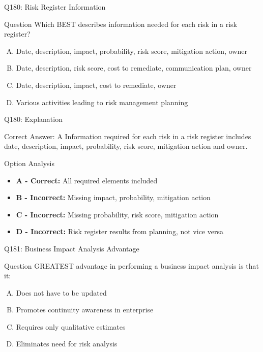 \documentclass{beamer}
\begin{document}
	\begin{frame}{Q180: Risk Register Information}
		\begin{block}{Question}
			Which BEST describes information needed for each risk in a risk register?
		\end{block}
		\begin{enumerate}[(A)]
			\item Date, description, impact, probability, risk score, mitigation action, owner
			\item Date, description, risk score, cost to remediate, communication plan, owner
			\item Date, description, impact, cost to remediate, owner
			\item Various activities leading to risk management planning
		\end{enumerate}
	\end{frame}
	
	\begin{frame}{Q180: Explanation}
		\begin{block}{Correct Answer: A}
			Information required for each risk in a risk register includes date, description, impact, probability, risk score, mitigation action and owner.
		\end{block}
		\begin{block}{Option Analysis}
			\begin{itemize}
				\item \textbf{A - Correct:} All required elements included
				\item \textbf{B - Incorrect:} Missing impact, probability, mitigation action
				\item \textbf{C - Incorrect:} Missing probability, risk score, mitigation action
				\item \textbf{D - Incorrect:} Risk register results from planning, not vice versa
			\end{itemize}
		\end{block}
	\end{frame}
	
	\begin{frame}{Q181: Business Impact Analysis Advantage}
		\begin{block}{Question}
			GREATEST advantage in performing a business impact analysis is that it:
		\end{block}
		\begin{enumerate}[(A)]
			\item Does not have to be updated
			\item Promotes continuity awareness in enterprise
			\item Requires only qualitative estimates
			\item Eliminates need for risk analysis
		\end{enumerate}
	\end{frame}
	
\end{document}
